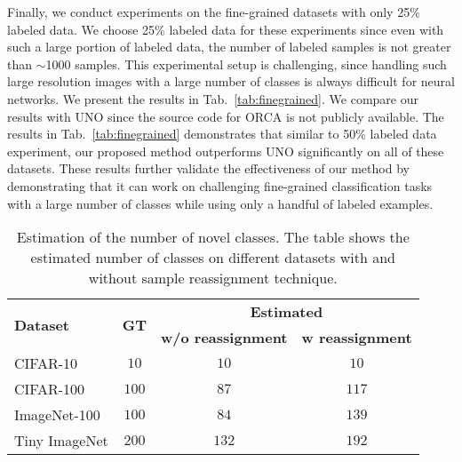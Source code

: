 \documentclass[runningheads]{eccv2022submission}
\begin{document}
Finally, we conduct experiments on the fine-grained datasets with only 25\% labeled data. We choose 25\% labeled data for these experiments since even with such a large portion of labeled data, the number of labeled samples is not greater than $\sim$1000 samples. This experimental setup is challenging, since handling such large resolution images with a large number of classes is always difficult for neural networks. We present the results in Tab.~\ref{tab:finegrained}. We compare our results with UNO\cite{fini2021unified} since the source code for ORCA is not publicly available. The results in Tab.~\ref{tab:finegrained} demonstrates that similar to 50\% labeled data experiment, our proposed method outperforms UNO significantly on all of these datasets. These results further validate the effectiveness of our method by demonstrating that it can work on challenging fine-grained classification tasks with a large number of classes while using only a handful of labeled examples.    








\begin{table}
\caption{Estimation of the number of novel classes. The table shows the estimated number of classes on different datasets with and without sample reassignment technique.}
\begin{center}\setlength{\tabcolsep}{4pt}
\small
\begin{tabular}{lccc}
\hline

\multicolumn{1}{l}{\multirow{2}{*}{\textbf{Dataset}}}  & \multicolumn{1}{c}{\multirow{2}{*}{\textbf{GT}}} & \multicolumn{2}{c}{\textbf{Estimated}}\\
\multicolumn{1}{c}{} & \multicolumn{1}{c}{} & \multicolumn{1}{c}{\textbf{w/o reassignment}} & \multicolumn{1}{c}{\textbf{w reassignment}}\\




\hline
CIFAR-10 & $10$ & $10$ & $10$\\
CIFAR-100 & $100$ & $87$ & $117$\\
ImageNet-100 & $100$ & $84$ & $139$\\
Tiny ImageNet & $200$ & $132$ & $192$\\
\hline 



\end{tabular}
\end{center}
\label{tab:estimation}
\vspace{-6mm}
\end{table}
\end{document}
